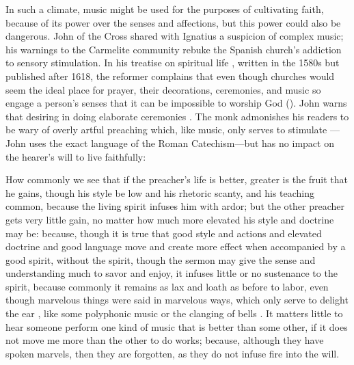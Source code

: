 In such a climate, music might be used for the purposes of cultivating faith,
because of its power over the senses and affections, but this power could also
be dangerous.
John of the Cross shared with Ignatius a suspicion of complex music; his
warnings to the Carmelite community rebuke the Spanish church's addiction to
sensory stimulation.
In his treatise on spiritual life , written
in the 1580s but published after 1618, the reformer complains that even though
churches would seem the ideal place for prayer, their decorations, ceremonies,
and music so engage a person's senses that it can be impossible to worship God
 ().%
    \Autocite
    [, , ]
    {JuandelaCruz:Subida}
John warns that desiring  in doing
elaborate ceremonies .%
    \Autocite
    [, , ]
    {JuandelaCruz:Subida}
The monk admonishes his readers to be wary of overly artful preaching which,
like music, only serves to stimulate ---John
uses the exact language of the Roman Catechism---but has no impact on the
hearer's will to live faithfully:
\begin{quoting}
    How commonly we see that \Dots{} if the preacher's life is better, greater
    is the fruit that he gains, though his style be low and his rhetoric scanty,
    and his teaching common, because the living spirit infuses him with ardor;
    but the other preacher gets very little gain, no matter how much more
    elevated his style and doctrine may be: because, though it is true that good
    style and actions and elevated doctrine and good language move and create
    more effect when accompanied by a good spirit, without the spirit, though
    the sermon may give the sense and understanding much to savor and enjoy, it
    infuses little or no sustenance to the spirit, because commonly it remains
    as lax and loath as before to labor, even though marvelous things were said
    in marvelous ways, which only serve to delight the ear , like
    some polyphonic music  or the clanging of
    bells \Dots{}.
    It matters little to hear someone perform one kind of music that is better
    than some other, if it does not move me more than the other to do works;
    because, although they have spoken marvels, then they are forgotten, as they
    do not infuse fire into the will.%
        \Autocite
        [, , ]
        {JuandelaCruz:Subida}
\end{quoting}
